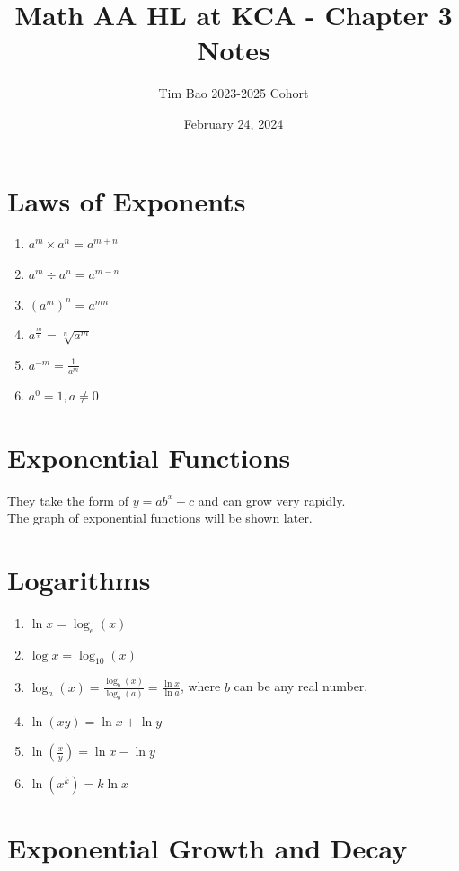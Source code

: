 \documentclass[11pt]{article}
\title{Math AA HL at KCA - Chapter 3 Notes}
\author{Tim Bao 2023-2025 Cohort}
\date{February 24, 2024}
\newcommand{\lb}{\\[8pt]}
\begin{document}
\maketitle
\pagebreak

\section{Laws of Exponents}

\begin{enumerate}
  \item $a^m \times a^n = a^{m + n}$
  \item $a^m \div a^n = a^{m - n}$
  \item $(a^m)^n = a^{mn}$
  \item $a^\frac{m}{n} = \sqrt[n]{a^m}$
  \item $a^{-m} = \frac{1}{a^m}$
  \item $a^0 = 1, a \not = 0$
\end{enumerate}

\section{Exponential Functions}

They take the form of $y = ab^x + c$ and can grow very rapidly.\lb
The graph of exponential functions will be shown later.

\section{Logarithms}

\begin{enumerate}
  \item $\ln x = \log_e(x)$
  \item $\log x = \log_{10}(x)$
  \item $\log_a(x) = \frac{\log_b(x)}{\log_b(a)} = \frac{\ln x}{\ln a}$, where $b$ can be any real number.
  \item $\ln (xy) = \ln x + \ln y$
  \item $\ln (\frac{x}{y}) = \ln x - \ln y$
  \item $\ln (x^k) = k\ln x$
\end{enumerate}

\pagebreak

\section{Exponential Growth and Decay}
\end{document}

